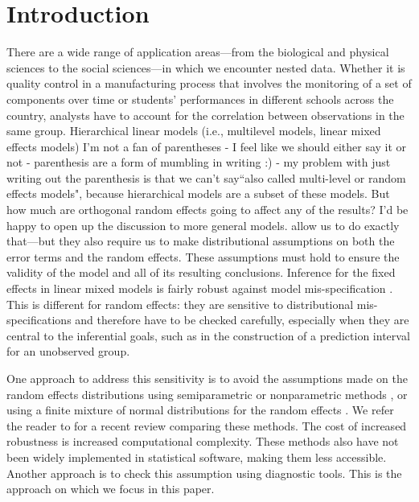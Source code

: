 \documentclass[12pt]{article} %
\newcommand{\hh}[1]{{\color{orange} #1}}
\newcommand{\al}[1]{{\color{red} #1}}
\begin{document}
\section{Introduction}\label{sec:intro}
There are a wide range of application areas---from the biological and physical sciences to the social sciences---in which we encounter nested  data.
Whether it is quality control in a manufacturing process that involves the monitoring of a set of components over  time  or students' performances in different schools across the country, analysts have to account for  the correlation between observations in the same group.  Hierarchical linear models \al{(i.e., multilevel models, linear mixed effects models)} \hh{I'm not a fan of parentheses - I feel like we should either say it or not - parenthesis are a form of mumbling in writing :)   -  my problem with just writing out the parenthesis is that we can't say``also called multi-level or random effects models", because hierarchical models are a subset of these models.  But how much are orthogonal random effects going to affect any of the results? I'd be happy to open up the discussion to more general models. } allow us to do exactly that---but they also require us to make distributional assumptions on both the error terms and the random effects. These assumptions must hold to ensure the validity of the model and all of its resulting conclusions. 
Inference for the fixed effects in linear mixed models is fairly robust against model mis-specification \citep{Butler:1992tx, Verbeke:1997tf}. This is different for random effects: they are sensitive to  distributional mis-specifications and  therefore have to be checked carefully, especially when they are central to the inferential goals, such as in the construction of a prediction interval for an unobserved group.

One approach to address this sensitivity is to avoid the assumptions made on the random effects distributions using semiparametric or nonparametric methods \citep{Shen:1999gd, Zhang:2001wo, Ghidey:2004id}, or using a finite mixture of normal distributions for the random effects \citep{Verbeke:1996va}. We refer the reader to \cite{Ghidey:2010de} for a recent review comparing these methods. The cost of increased robustness is increased computational complexity. These methods also have not been widely implemented in statistical software, making them less accessible. Another approach is to check this assumption using diagnostic tools. This is the approach on which we focus in this paper.
\end{document}
